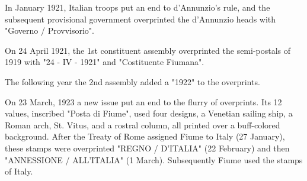 In January 1921, Italian troops put an end to d'Annunzio's rule, and the subsequent provisional government overprinted the d'Annunzio heads with "Governo / Provvisorio".



On 24 April 1921, the 1st constituent assembly overprinted the semi-postals of 1919 with "24 - IV - 1921" and "Costituente Fiumana". 

The following year the 2nd assembly added a "1922" to the overprints.



On 23 March, 1923 a new issue put an end to the flurry of overprints. Its 12 values, inscribed "Posta di Fiume", used four designs, a Venetian sailing ship, a Roman arch, St. Vitus, and a rostral column, all printed over a buff-colored background. After the Treaty of Rome assigned Fiume to Italy (27 January), these stamps were overprinted "REGNO / D'ITALIA" (22 February) and then "ANNESSIONE / ALL'ITALIA" (1 March). Subsequently Fiume used the stamps of Italy.



                               